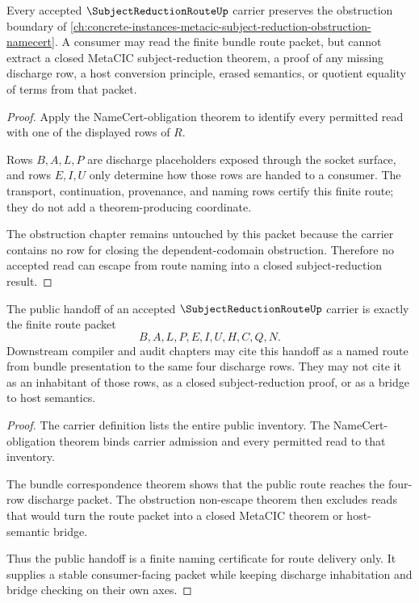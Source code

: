 \begin{theorem}
\label{thm:subject-reduction-route-obstruction-nonescape}
Every accepted $\SubjectReductionRouteUp$ carrier preserves the obstruction boundary of \autoref{ch:concrete-instances-metacic-subject-reduction-obstruction-namecert}. A consumer may read the finite bundle route packet, but cannot extract a closed MetaCIC subject-reduction theorem, a proof of any missing discharge row, a host conversion principle, erased semantics, or quotient equality of terms from that packet.
\end{theorem}
\begin{proof}
Apply the NameCert-obligation theorem to identify every permitted read with one of the displayed rows of $R$.

Rows $B,A,L,P$ are discharge placeholders exposed through the socket surface, and rows $E,I,U$ only determine how those rows are handed to a consumer. The transport, continuation, provenance, and naming rows certify this finite route; they do not add a theorem-producing coordinate.

The obstruction chapter remains untouched by this packet because the carrier contains no row for closing the dependent-codomain obstruction. Therefore no accepted read can escape from route naming into a closed subject-reduction result.
\end{proof}

\begin{theorem}
\label{thm:subject-reduction-route-public-handoff}
The public handoff of an accepted $\SubjectReductionRouteUp$ carrier is exactly the finite route packet
$$
B,A,L,P,E,I,U,H,C,Q,N.
$$
Downstream compiler and audit chapters may cite this handoff as a named route from bundle presentation to the same four discharge rows. They may not cite it as an inhabitant of those rows, as a closed subject-reduction proof, or as a bridge to host semantics.
\end{theorem}
\begin{proof}
The carrier definition lists the entire public inventory. The NameCert-obligation theorem binds carrier admission and every permitted read to that inventory.

The bundle correspondence theorem shows that the public route reaches the four-row discharge packet. The obstruction non-escape theorem then excludes reads that would turn the route packet into a closed MetaCIC theorem or host-semantic bridge.

Thus the public handoff is a finite naming certificate for route delivery only. It supplies a stable consumer-facing packet while keeping discharge inhabitation and bridge checking on their own axes.
\end{proof}


